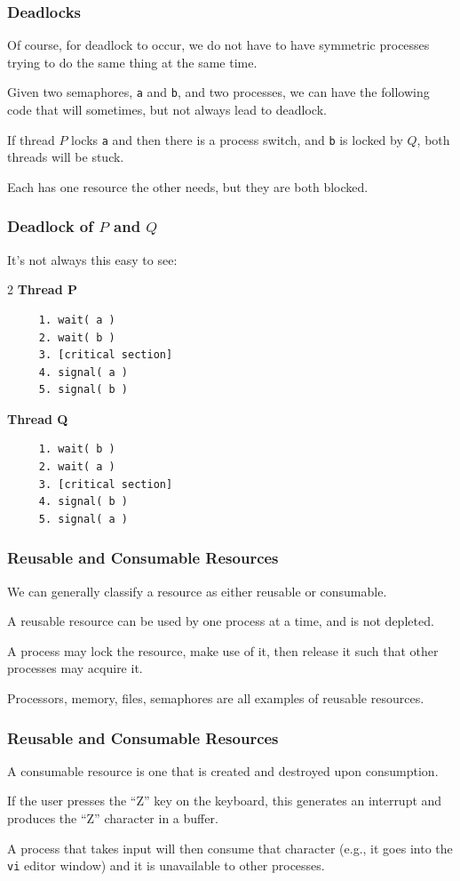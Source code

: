 \begin{frame}
	\frametitle{Deadlocks}

	Of course, for deadlock to occur, we do not have to have symmetric processes trying to do the same thing at the same time.

	Given two semaphores, \texttt{a} and \texttt{b}, and two processes, we can have the following code that will sometimes, but not always lead to deadlock.

	If thread $P$ locks \texttt{a} and then there is a process switch, and \texttt{b} is locked by $Q$, both threads will be stuck.

	Each has one resource the other needs, but they are both blocked.


\end{frame}

\begin{frame}[fragile]
	\frametitle{Deadlock of $P$ and $Q$}
	It's not always this easy to see:


	\begin{multicols}{2}
		\textbf{Thread P}
		\begin{verbatim}
	 1. wait( a ) 
	 2. wait( b )
	 3. [critical section]
	 4. signal( a )
	 5. signal( b )
  \end{verbatim}
		\columnbreak
		\textbf{Thread Q}
		\begin{verbatim}
	 1. wait( b ) 
	 2. wait( a )
	 3. [critical section]
	 4. signal( b )
	 5. signal( a )

  \end{verbatim}
	\end{multicols}

\end{frame}


\begin{frame}
	\frametitle{Reusable and Consumable Resources}
	We can generally classify a resource as either \alert{reusable} or \alert{consumable}.

	A reusable resource can be used by one process at a time, and is not depleted.

	A process may lock the resource, make use of it, then release it such that other processes may acquire it.

	Processors, memory, files, semaphores are all examples of reusable resources.

\end{frame}

\begin{frame}
	\frametitle{Reusable and Consumable Resources}

	A consumable resource is one that is created and destroyed upon consumption.

	If the user presses the ``Z'' key on the keyboard, this generates an interrupt and produces the ``Z'' character in a buffer.

	A process that takes input will then consume that character (e.g., it goes into the \texttt{vi} editor window) and it is unavailable to other processes.

\end{frame}

